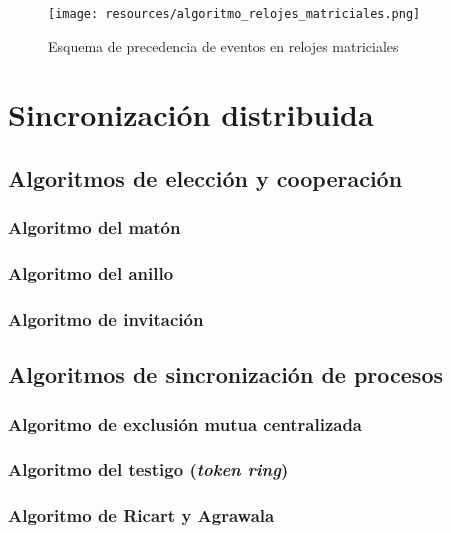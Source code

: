 \documentclass[a4paper, 11pt, titlepage]{article}
\begin{document}
            \begin{figure}[htp]
                \centering
                \texttt{[image: resources/algoritmo\_relojes\_matriciales.png]}
                \caption{Esquema de precedencia de eventos en relojes matriciales}
                \label{algoritmo_relojes_matriciales}
            \end{figure}

\section{Sincronización distribuida}

    \subsection{Algoritmos de elección y cooperación}

        \subsubsection{Algoritmo del matón}

        \subsubsection{Algoritmo del anillo}

        \subsubsection{Algoritmo de invitación}

    \subsection{Algoritmos de sincronización de procesos}

        \subsubsection{Algoritmo de exclusión mutua centralizada}

        \subsubsection{Algoritmo del testigo (\textit{token ring})}

        \subsubsection{Algoritmo de Ricart y Agrawala}
\end{document}
